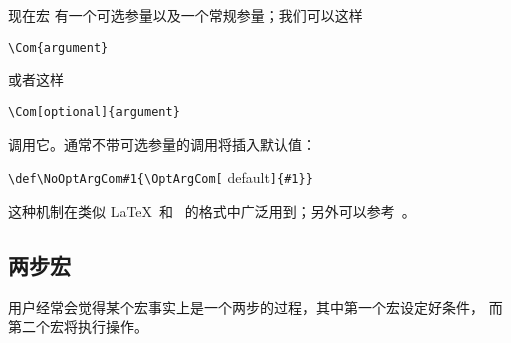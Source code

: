 \documentclass[letterpaper]{book}
\begin{document}
现在宏  有一个可选参量以及一个常规参量；我们可以这样
\begin{verbatim}
\Com{argument}
\end{verbatim}
或者这样
\begin{verbatim}
\Com[optional]{argument}
\end{verbatim}
调用它。通常不带可选参量的调用将插入默认值：
\begin{disp}\verb>\def\NoOptArgCom#1{\OptArgCom[>%
{\italic default\/}\verb>]{#1}}>\end{disp}
这种机制在类似 \LaTeX\ 和 \LamsTeX\ 的格式中广泛用到；另外可以参考~\cite{svb:future}。



\subsection{两步宏}

用户经常会觉得某个宏事实上是一个两步的过程，其中第一个宏设定好条件，
而第二个宏将执行操作。
\end{document}
